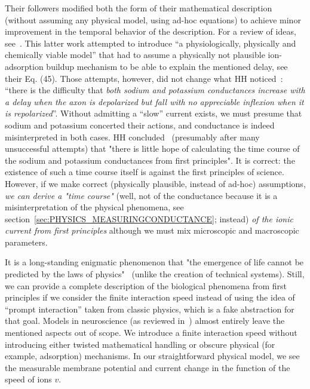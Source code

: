 Their followers modified both the form of their mathematical description
(without assuming any physical model, using ad-hoc equations) to achieve minor improvement in the temporal behavior of the
description. For a review of ideas, see~\cite{Hodgkin-HuxleyAdsorption:2021}.
This latter work attempted to introduce ``a physiologically, physically
and chemically viable model'' that had to assume a physically not
plausible ion-adsorption buildup mechanism to be able to explain the
mentioned delay, see their Eq. (45). Those attempts, however, did
not change what \gls{HH} noticed~\cite{HodgkinHuxley:1952}:
``there is the difficulty that \emph{both sodium and
	potassium conductances increase with a delay when the axon is depolarized
	but fall with no appreciable inflexion when it is repolarized}''.
Without admitting a ``slow'' current exists, we must presume
that sodium and potassium concerted their actions, and conductance
is indeed misinterpreted in both cases. HH concluded~\cite{HodgkinHuxley:1952}
(presumably after many unsuccessful attempts) that "there is little
hope of calculating the time course of the sodium and potassium conductances
from first principles". 
It is correct: the existence of such a time course itself is against the first principles of science.
However, if we make correct (physically
plausible, instead of ad-hoc) assumptions, \textit{we can derive a "time course"} (well, not
of the conductance because it is a misinterpretation of the physical
phenomena, see section~\ref{sec:PHYSICS_MEASURINGCONDUCTANCE}; instead) \textit{of the ionic current from first principles} although
we must mix microscopic and macroscopic parameters. 

It is a long-standing enigmatic phenomenon
that "the emergence of life cannot be predicted by the laws of physics"~\cite{ConservationOfInformation:2021}
(unlike the creation of technical systems). Still, we can provide
a complete description of the biological phenomena from first principles
if we consider the finite interaction speed instead of using the idea
of ``prompt interaction'' taken from classic physics, which is a
fake abstraction for that goal. Models in neuroscience (as reviewed
in~\cite{BrainNetworkModels:2018}) almost entirely leave the mentioned
aspects out of scope. We introduce a finite interaction speed  without introducing
either twisted mathematical handling or obscure physical (for example,
adsorption) mechanisms. In our straightforward physical model, we see
the measurable membrane potential and current change in the function of
the speed of ions $v$. 


